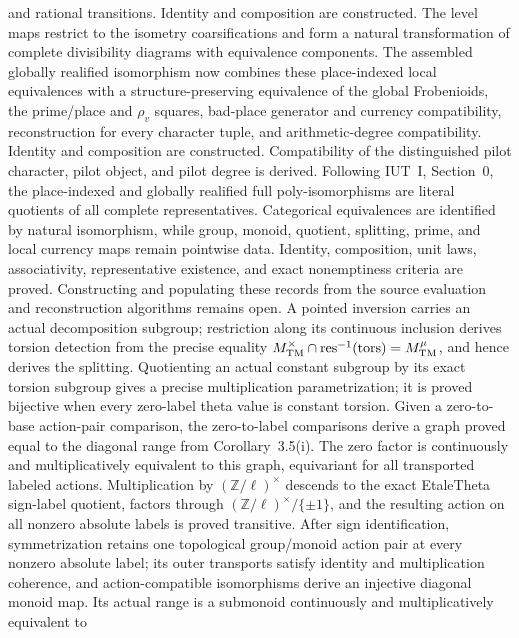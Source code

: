 \begin{definition}
  and rational transitions.  Identity and composition are constructed.  The
  level maps restrict to the isometry coarsifications and form a natural
  transformation of complete divisibility diagrams with equivalence
  components.  The assembled globally realified isomorphism now combines
  these place-indexed local equivalences with a
  structure-preserving equivalence of the global Frobenioids, the prime/place
  and \(\rho_v\) squares, bad-place generator and currency compatibility,
  reconstruction for every character tuple, and arithmetic-degree
  compatibility.  Identity and composition are constructed.  Compatibility
  of the distinguished pilot character, pilot object, and pilot degree is
  derived.  Following IUT~I, Section~0, the place-indexed and globally
  realified full poly-isomorphisms are literal quotients of all complete
  representatives.  Categorical equivalences are identified by natural
  isomorphism, while group, monoid, quotient, splitting, prime, and local
  currency maps remain pointwise data.  Identity, composition, unit laws,
  associativity, representative existence, and exact nonemptiness criteria
  are proved.  Constructing and populating these records from the source
  evaluation and reconstruction algorithms remains open.
  A pointed inversion carries an
  actual decomposition subgroup; restriction along its continuous inclusion
  derives torsion detection from the precise equality
  \(M_{\rm TM}^{\times}\cap\operatorname{res}^{-1}(\mathrm{tors})=
  M_{\rm TM}^{\mu}\), and hence derives the splitting.
  Quotienting an actual constant subgroup by its exact torsion
  subgroup gives a precise multiplication parametrization; it is proved
  bijective when every zero-label theta value is constant torsion.  Given a
  zero-to-base action-pair comparison, the zero-to-label comparisons derive a
  graph proved equal to the diagonal range from Corollary~3.5(i).  The zero
  factor is continuously and multiplicatively equivalent to this graph,
  equivariant for all transported labeled actions.
  Multiplication by \((\mathbb Z/\ell)^\times\) descends to
  the exact EtaleTheta sign-label quotient, factors through
  \((\mathbb Z/\ell)^\times/\{\pm1\}\), and the resulting action on all
  nonzero absolute labels is proved transitive.  After sign identification,
  symmetrization retains one
  topological group/monoid action pair at every nonzero absolute label;
  its outer transports satisfy identity and multiplication coherence, and
  action-compatible isomorphisms derive an injective diagonal monoid map.  Its
  actual range is a submonoid continuously and multiplicatively equivalent to

\end{definition}
